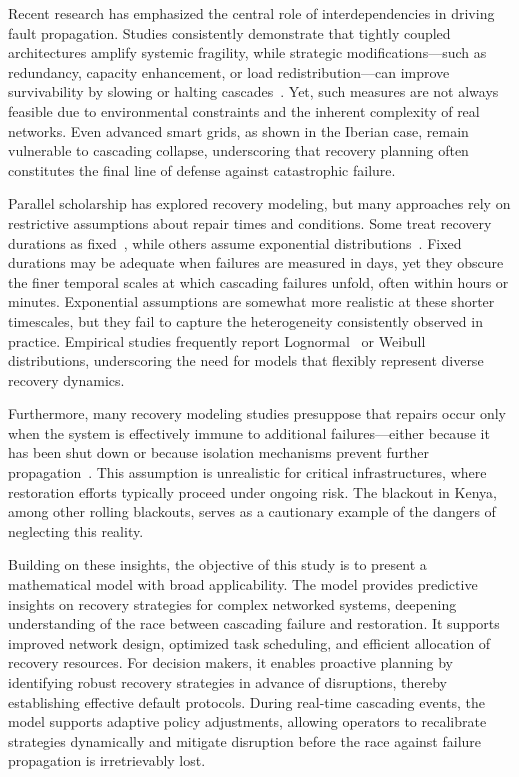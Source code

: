 \documentclass[runningheads]{llncs}
\begin{document}
Recent research has emphasized the central role of interdependencies in driving fault propagation. Studies consistently demonstrate that tightly coupled architectures amplify systemic fragility, while strategic modifications—such as redundancy, capacity enhancement, or load redistribution—can improve survivability by slowing or halting cascades~\cite{zhang_effects_2017}. Yet, such measures are not always feasible due to environmental constraints and the inherent complexity of real networks. Even advanced smart grids, as shown in the Iberian case, remain vulnerable to cascading collapse, underscoring that recovery planning often constitutes the final line of defense against catastrophic failure.

Parallel scholarship has explored recovery modeling, but many approaches rely on restrictive assumptions about repair times and conditions. Some treat recovery durations as fixed~\cite{sarkale_solving_2018,biswas_repair_2025}, while others assume exponential distributions~\cite{yan_dynamic_2021}. Fixed durations may be adequate when failures are measured in days, yet they obscure the finer temporal scales at which cascading failures unfold, often within hours or minutes. Exponential assumptions are somewhat more realistic at these shorter timescales, but they fail to capture the heterogeneity consistently observed in practice. Empirical studies frequently report Lognormal~\cite{l_c_cadwallader_review_2012} or Weibull~\cite{ocansey_temperature-driven_2025} distributions, underscoring the need for models that flexibly represent diverse recovery dynamics. 

Furthermore, many recovery modeling studies presuppose that repairs occur only when the system is effectively immune to additional failures—either because it has been shut down or because isolation mechanisms prevent further propagation~\cite{sarkale_solving_2018, yan_dynamic_2021,wang_q-learning-based_2025}. This assumption is unrealistic for critical infrastructures, where restoration efforts typically proceed under ongoing risk. The blackout in Kenya, among other rolling blackouts, serves as a cautionary example of the dangers of neglecting this reality.

Building on these insights, the objective of this study is to present a mathematical model with broad applicability. The model provides predictive insights on recovery strategies for complex networked systems, deepening understanding of the race between cascading failure and restoration. It supports improved network design, optimized task scheduling, and efficient allocation of recovery resources. For decision makers, it enables proactive planning by identifying robust recovery strategies in advance of disruptions, thereby establishing effective default protocols. During real-time cascading events, the model supports adaptive policy adjustments, allowing operators to recalibrate strategies dynamically and mitigate disruption before the race against failure propagation is irretrievably lost.
\end{document}
